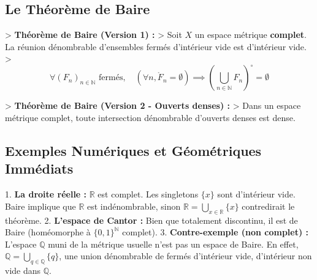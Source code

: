 \documentclass[11pt,a4paper]{article}
\begin{document}
\subsection{Le Théorème de Baire}

> \textbf{Théorème de Baire (Version 1) :}
> Soit $X$ un espace métrique \textbf{complet}. La réunion dénombrable d'ensembles fermés d'intérieur vide est d'intérieur vide.
> $$\forall (F_n)_{n \in \mathbb{N}} \text{ fermés}, \quad (\forall n, \mathring{F}_n = \emptyset) \implies \left( \bigcup_{n \in \mathbb{N}} F_n \right)^{\circ} = \emptyset$$

> \textbf{Théorème de Baire (Version 2 - Ouverts denses) :}
> Dans un espace métrique complet, toute intersection dénombrable d'ouverts denses est dense.


\subsection{Exemples Numériques et Géométriques Immédiats}

1. \textbf{La droite réelle :} $\mathbb{R}$ est complet. Les singletons $\{x\}$ sont d'intérieur vide. Baire implique que $\mathbb{R}$ est indénombrable, sinon $\mathbb{R} = \bigcup_{x\in \mathbb{R}} \{x\}$ contredirait le théorème.
2. \textbf{L'espace de Cantor :} Bien que totalement discontinu, il est de Baire (homéomorphe à $\{0,1\}^{\mathbb{N}}$ complet).
3. \textbf{Contre-exemple (non complet) :} L'espace $\mathbb{Q}$ muni de la métrique usuelle n'est pas un espace de Baire. En effet, $\mathbb{Q} = \bigcup_{q\in \mathbb{Q}} \{q\}$, une union dénombrable de fermés d'intérieur vide, d'intérieur non vide dans $\mathbb{Q}$.

\end{document}
